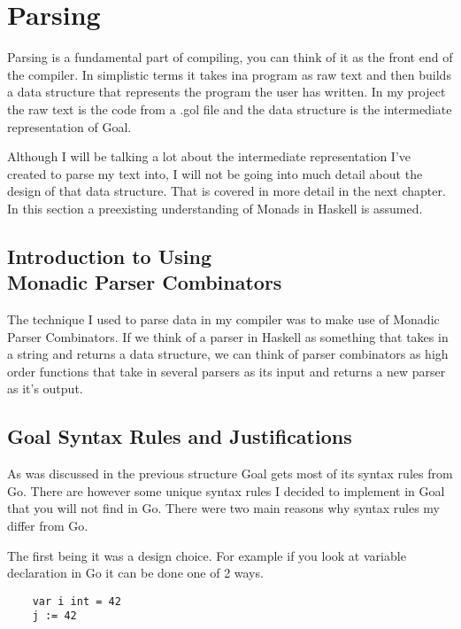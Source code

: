 
\chapter{Parsing}

Parsing is a fundamental part of compiling, you can think of it as the front end of the compiler. In simplistic terms it takes ina program as raw text and then builds a data structure that represents the program the user has written. In my project the raw text is the code from a .gol file and the data structure is the intermediate representation of Goal. 

Although I will be talking a lot about the intermediate representation I've created to parse my text into, I will not be going into much detail about the design of that data structure. That is covered in more detail in the next chapter. In this section a preexisting understanding of Monads in Haskell is assumed.      

\section[Introduction to Using Monadic Parser Combinators]{Introduction to Using \\ Monadic Parser Combinators}

The technique I used to parse data in my compiler was to make use of Monadic Parser Combinators. If we think of a parser in Haskell as something that takes in a string and returns a data structure, we can think of parser combinators as high order functions that take in several parsers as its input and returns a new parser as it's output.  

\section{Goal Syntax Rules and Justifications}

As was discussed in the previous structure Goal gets most of its syntax rules from Go. There are however some unique syntax rules I decided to implement in Goal that you will not find in Go. There were two main reasons why syntax rules my differ from Go. 

The first being it was a design choice. For example if you look at variable declaration in Go it can be done one of 2 ways.

\begin{lstlisting}
	var i int = 42
	j := 42
\end{lstlisting}    

